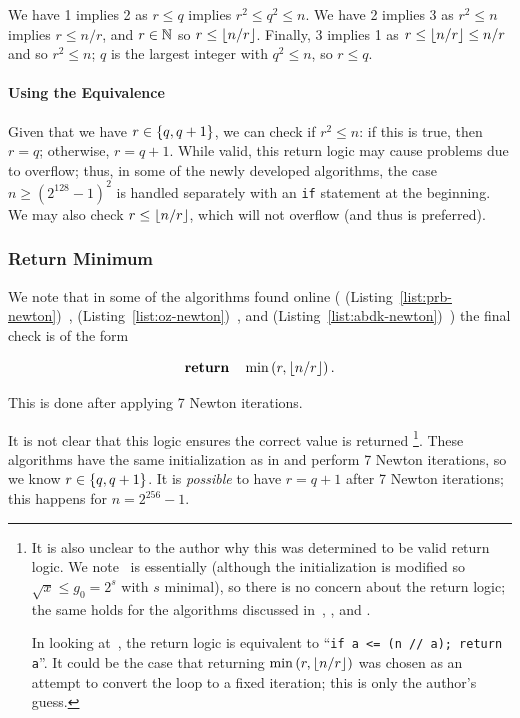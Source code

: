 \noindent
We have 1 implies 2 as $r\le q$ implies $r^{2} \le q^{2} \le n$.
We have 2 implies 3 as $r^{2} \le n$ implies $r \le n/r$,
and $r\in\mathbb{N}$ so $r \le \left\lfloor n/r \right\rfloor$.
Finally, 3 implies 1 as $r \le \left\lfloor n/r \right\rfloor \le n/r$
and so $r^{2} \le n$;
$q$ is the largest integer with $q^{2} \le n$, so $r \le q$.

\paragraph{Using the Equivalence}
Given that we have $r\in\left\{ q,q+1 \right\}$,
we can check if $r^{2}\le n$:
if this is true, then $r=q$; otherwise, $r=q+1$.
While valid,
this return logic may cause problems due to overflow;
thus, in some of the newly developed algorithms,
the case $n\ge(2^{128}-1)^{2}$ is handled separately with an \texttt{if}
statement at the beginning.
We may also check $r\le \left\lfloor n/r \right\rfloor$,
which will not overflow (and thus is preferred).

\subsubsection{Return Minimum}
We note that in some of the algorithms found online
(\prb{} (Listing~\ref{list:prb-newton})~\cite{prb-math},
\OpenZeppelin{} (Listing~\ref{list:oz-newton})~\cite{open-zeppelin}, and
\abdk{} (Listing~\ref{list:abdk-newton})~\cite{abdk-consulting})
the final check is of the form

\begin{equation}
    \Return \quad\min\parens{r, \floor{n/r}}.
\end{equation}

\noindent
This is done after applying 7 Newton iterations.

It is not clear that this logic ensures the correct value is returned%
\footnote{It is also unclear to the author why this was determined
to be valid return logic.
We note~\cite[Figure 11-1, Integer square root,
Newton's method]{HackersDelight} is essentially \WhileTwo{}
(although the initialization is modified so $\sqrt{x} \le g_{0} = 2^{s}$
with $s$ minimal), so there is no concern about the return logic;
the same holds for the algorithms discussed
in~\cite[Algorithm 1.7.1]{cohen1993},
\cite[Algorithm 9.2.11]{PrimeNumbersACP2005},
and \cite[Algorithm 1.13]{ModernComputerArithmetic051}.

In looking at~\cite[Listing 2]{PythonIsqrt},
the return logic is equivalent to ``\texttt{if a <= (n // a); return a}''.
It could be the case that returning $\min\left( r, \left\lfloor n/r \right\rfloor \right)$
was chosen as an attempt to convert the loop
to a fixed iteration;
this is only the author's guess.
}.
These algorithms have the same initialization
as in \UnrolledOne{} and perform 7 Newton iterations, so we know
$r\in\left\{ q, q+1 \right\}$.
It is \emph{possible} to have $r=q+1$ after 7 Newton iterations;
this happens for $n=2^{256}-1$.

